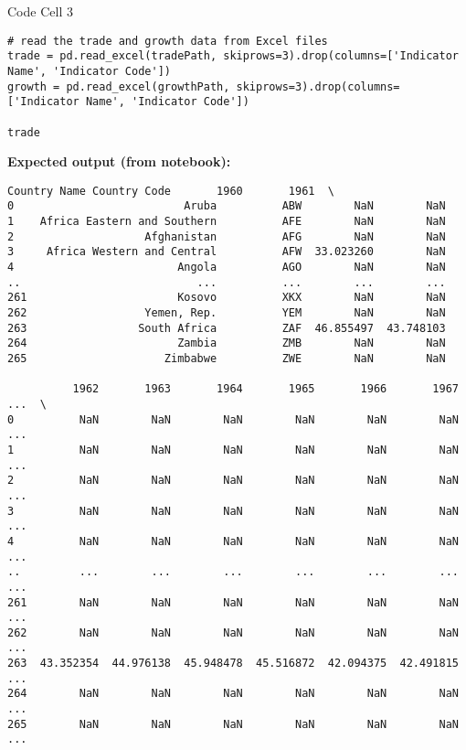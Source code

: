 \documentclass[notes,11pt, aspectratio=169, xcolor=table]{beamer}
\begin{document}
\begin{frame}[fragile]{Code Cell 3}
\begin{verbatim}
# read the trade and growth data from Excel files
trade = pd.read_excel(tradePath, skiprows=3).drop(columns=['Indicator Name', 'Indicator Code'])
growth = pd.read_excel(growthPath, skiprows=3).drop(columns=['Indicator Name', 'Indicator Code'])

trade
\end{verbatim}
\vspace{0.5ex}
\textbf{Expected output (from notebook):}
\begin{verbatim}
Country Name Country Code       1960       1961  \
0                          Aruba          ABW        NaN        NaN   
1    Africa Eastern and Southern          AFE        NaN        NaN   
2                    Afghanistan          AFG        NaN        NaN   
3     Africa Western and Central          AFW  33.023260        NaN   
4                         Angola          AGO        NaN        NaN   
..                           ...          ...        ...        ...   
261                       Kosovo          XKX        NaN        NaN   
262                  Yemen, Rep.          YEM        NaN        NaN   
263                 South Africa          ZAF  46.855497  43.748103   
264                       Zambia          ZMB        NaN        NaN   
265                     Zimbabwe          ZWE        NaN        NaN   

          1962       1963       1964       1965       1966       1967  ...  \
0          NaN        NaN        NaN        NaN        NaN        NaN  ...   
1          NaN        NaN        NaN        NaN        NaN        NaN  ...   
2          NaN        NaN        NaN        NaN        NaN        NaN  ...   
3          NaN        NaN        NaN        NaN        NaN        NaN  ...   
4          NaN        NaN        NaN        NaN        NaN        NaN  ...   
..         ...        ...        ...        ...        ...        ...  ...   
261        NaN        NaN        NaN        NaN        NaN        NaN  ...   
262        NaN        NaN        NaN        NaN        NaN        NaN  ...   
263  43.352354  44.976138  45.948478  45.516872  42.094375  42.491815  ...   
264        NaN        NaN        NaN        NaN        NaN        NaN  ...   
265        NaN        NaN        NaN        NaN        NaN        NaN  ...   


\end{verbatim}
\end{frame}
\end{document}

